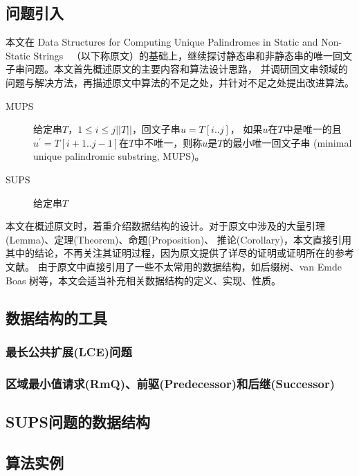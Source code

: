 \subsection{问题引入}\label{subsec:intro}

本文在 Data Structures for Computing Unique Palindromes in Static and Non-Static Strings~\cite{Mieno2024}
（以下称原文）的基础上，继续探讨静态串和非静态串的唯一回文子串问题。本文首先概述原文的主要内容和算法设计思路，
并调研回文串领域的问题与解决方法，再描述原文中算法的不足之处，并针对不足之处提出改进算法。

\begin{description}
    \item [MUPS] 给定串$T$，$1 \leq i \leq j ||T||$，回文子串$u = T[i..j]$，
    如果$u$在$T$中是唯一的且$u^{\prime} = T[i + 1..j - 1]$在$T$中不唯一，则称$u$是$T$的最小唯一回文子串
    (minimal unique palindromic substring, MUPS)。
    \item [SUPS] 给定串$T$
\end{description}

本文在概述原文时，着重介绍数据结构的设计。对于原文中涉及的大量引理(Lemma)、定理(Theorem)、命题(Proposition)、
推论(Corollary)，本文直接引用其中的结论，不再关注其证明过程，因为原文提供了详尽的证明或证明所在的参考文献。
由于原文中直接引用了一些不太常用的数据结构，如后缀树、van Emde Boas 树等，本文会适当补充相关数据结构的定义、实现、性质。

\subsection{数据结构的工具}\label{subsec:fond}

\subsubsection{最长公共扩展(LCE)问题}\label{subsubsec:lce}

\subsubsection{区域最小值请求(RmQ)、前驱(Predecessor)和后继(Successor)}\label{subsubsec:rmq}

\subsection{SUPS问题的数据结构}\label{subsec:sups}

\subsection{算法实例}\label{subsec:eg}
